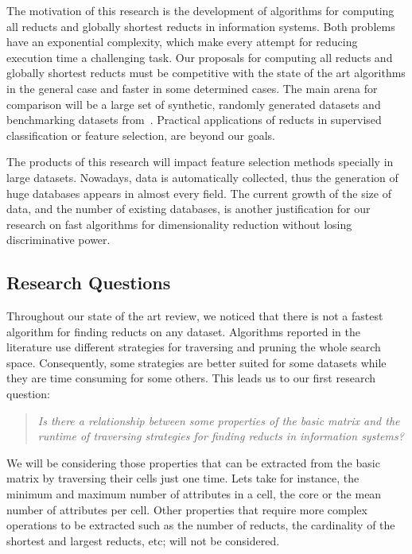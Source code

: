 \documentclass[authoryear,11pt]{elsarticle}
\begin{document}
  The motivation of this research is the development of algorithms for computing all reducts and 
  globally shortest reducts in information systems. Both problems have an exponential complexity, which 
  make every attempt for reducing execution time a challenging task.
  Our proposals for computing all reducts and globally shortest reducts must be competitive with the state of 
  the art algorithms in the general case and faster in some determined cases. The main arena for comparison 
  will be a large set of synthetic, randomly generated datasets and benchmarking datasets from~\citep{Bache13}. 
  Practical applications of reducts in supervised classification or feature selection, are beyond our goals.
  
  The products of this research will impact feature selection methods specially in large datasets.
  Nowadays, data is automatically collected, thus the generation of huge databases appears in almost every 
  field. The current growth of the size of data, and the number of existing databases, is another justification 
  for our research on fast algorithms for dimensionality reduction without losing discriminative power.  
  
\subsection{Research Questions}\label{ResearchQuestions} 
  Throughout our state of the art review, we noticed that there is not a fastest algorithm for finding reducts 
  on any dataset. Algorithms reported in the literature use different strategies for traversing and pruning 
  the whole search space. Consequently, some strategies are better suited for some datasets while they are time
  consuming for some others. This leads us to our first research question:
  
\begin{quote}
  \emph{Is there a relationship between some properties of the basic matrix and the runtime 
  		of traversing strategies for finding reducts in information systems?}
\end{quote}
  		
  We will be considering those properties that can be extracted from the basic matrix by traversing their 
  cells just one time. Lets take for instance, the minimum and maximum number of attributes in a cell, the 
  core or the mean number of attributes per cell. Other properties that require more complex operations to 
  be extracted such as the number of reducts, the cardinality of the shortest and largest reducts, etc; 
  will not be considered.
  
\end{document}
